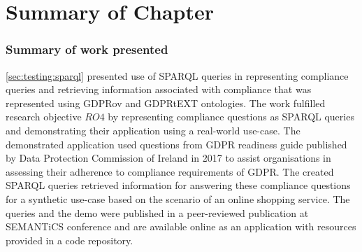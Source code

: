 
\section*{Summary of Chapter}\label{sec:testing:conclusion}

\subsubsection*{Summary of work presented}
\autoref{sec:testing:sparql} presented use of SPARQL queries in representing compliance queries and retrieving information associated with compliance that was represented using GDPRov and GDPRtEXT ontologies.
The work fulfilled research objective $RO4$ by representing compliance questions as SPARQL queries and demonstrating their application using a real-world use-case.
The demonstrated application used questions from GDPR readiness guide published by Data Protection Commission of Ireland in 2017 to assist organisations in assessing their adherence to compliance requirements of GDPR.
The created SPARQL queries retrieved information for answering these compliance questions for a synthetic use-case based on the scenario of an online shopping service.
The queries and the demo were published in a peer-reviewed publication \cite{pandit_queryable_2018} at SEMANTiCS conference and are available online as an application with resources provided in a code repository.

